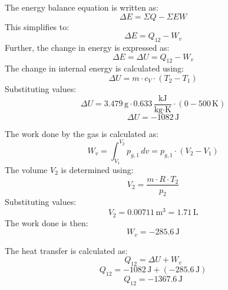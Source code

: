 The energy balance equation is written as:  
\[
\Delta E = \Sigma Q - \Sigma EW
\]  
This simplifies to:  
\[
\Delta E = Q_{12} - W_v
\]  
Further, the change in energy is expressed as:  
\[
\Delta E = \Delta U = Q_{12} - W_v
\]  
The change in internal energy is calculated using:  
\[
\Delta U = m \cdot c_V \cdot (T_2 - T_1)
\]  
Substituting values:  
\[
\Delta U = 3.479 \, \text{g} \cdot 0.633 \, \frac{\text{kJ}}{\text{kg·K}} \cdot (0 - 500 \, \text{K})
\]  
\[
\Delta U = -1082 \, \text{J}
\]  

The work done by the gas is calculated as:  
\[
W_v = \int_{V_1}^{V_2} p_{g,1} \, dv = p_{g,1} \cdot (V_2 - V_1)
\]  
The volume \( V_2 \) is determined using:  
\[
V_2 = \frac{m \cdot R \cdot T_2}{p_2}
\]  
Substituting values:  
\[
V_2 = 0.00711 \, \text{m}^3 = 1.71 \, \text{L}
\]  
The work done is then:  
\[
W_v = -285.6 \, \text{J}
\]  

The heat transfer is calculated as:  
\[
Q_{12} = \Delta U + W_v
\]  
\[
Q_{12} = -1082 \, \text{J} + (-285.6 \, \text{J})
\]  
\[
Q_{12} = -1367.6 \, \text{J}
\]
